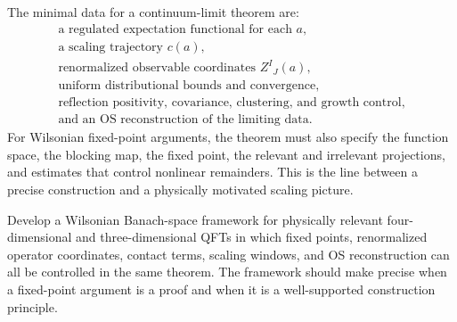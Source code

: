 The minimal data for a continuum-limit theorem are:
\[
\begin{gathered}
  \text{a regulated expectation functional for each }a,\\
  \text{a scaling trajectory }c(a),\\
  \text{renormalized observable coordinates }Z^I{}_J(a),\\
  \text{uniform distributional bounds and convergence},\\
  \text{reflection positivity, covariance, clustering, and growth control},\\
  \text{and an OS reconstruction of the limiting data.}
\end{gathered}
\]
For Wilsonian fixed-point arguments, the theorem must also specify the
function space, the blocking map, the fixed point, the relevant and
irrelevant projections, and estimates that control nonlinear remainders.
This is the line between a precise construction and a physically motivated
scaling picture.

\begin{openproblem}
\label{op:nonperturbative-wilsonian-fixed-points}
Develop a Wilsonian Banach-space framework for physically relevant
four-dimensional and three-dimensional QFTs in which fixed points,
renormalized operator coordinates, contact terms, scaling windows, and OS
reconstruction can all be controlled in the same theorem.  The framework
should make precise when a fixed-point argument is a proof and when it is a
well-supported construction principle.
\end{openproblem}
